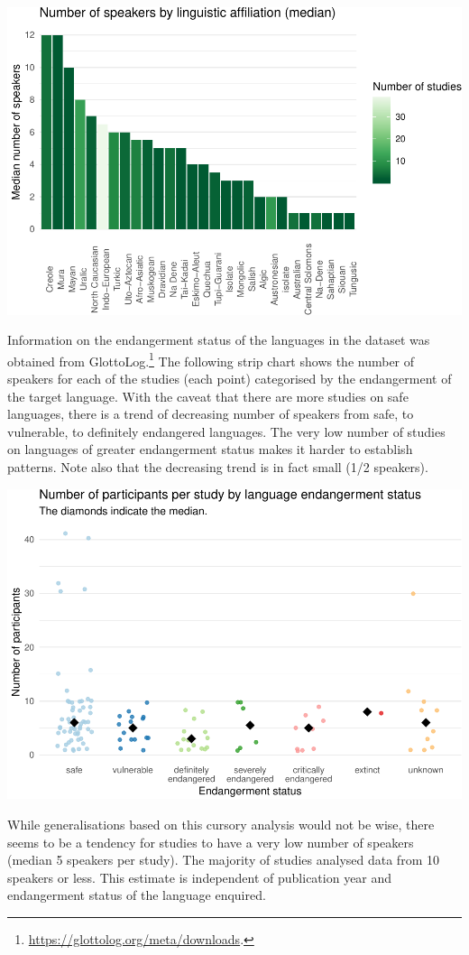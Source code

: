 \documentclass[12pt,a4paper,]{article}
\begin{document}
\includegraphics{2020-os_files/figure-latex/participants-affiliation-1.pdf}

Information on the endangerment status of the languages in the dataset
was obtained from
GlottoLog.\footnote{\url{https://glottolog.org/meta/downloads}.} The
following strip chart shows the number of speakers for each of the
studies (each point) categorised by the endangerment of the target
language. With the caveat that there are more studies on safe languages,
there is a trend of decreasing number of speakers from safe, to
vulnerable, to definitely endangered languages. The very low number of
studies on languages of greater endangerment status makes it harder to
establish patterns. Note also that the decreasing trend is in fact small
(1/2 speakers).

\includegraphics{2020-os_files/figure-latex/status-1.pdf}

While generalisations based on this cursory analysis would not be wise,
there seems to be a tendency for studies to have a very low number of
speakers (median 5 speakers per study). The majority of studies analysed
data from 10 speakers or less. This estimate is independent of
publication year and endangerment status of the language enquired.


\end{document}
